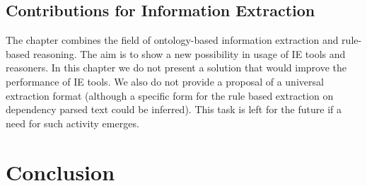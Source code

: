 \subsection{Contributions for Information Extraction}The chapter combines the field of ontology-based information extraction and rule-based reasoning. The aim is to show a new possibility in usage of IE tools and reasoners. In this chapter we do not present a solution that would improve the performance of IE tools.
We also do not provide a proposal of a universal extraction format (although a specific form for the rule based extraction on dependency parsed text could be inferred). This task is left for the future if a need for such activity emerges.


\section{Conclusion} \label{sec:ch70_conclusion}


   
